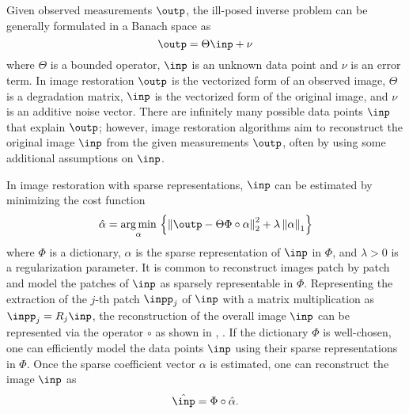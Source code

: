 \documentclass[journal]{IEEEtran}
\begin{document}
Given observed measurements $\outp$, the ill-posed inverse problem can be generally formulated in a Banach space as
\begin{equation}
	\label{eqn:inverse}
	\outp = \Theta \inp+\nu
\end{equation}
where $\Theta$ is a bounded operator, $\inp$ is an unknown data point and $\nu$ is an error term.  In image restoration $\outp$ is the vectorized form of an observed image, $\Theta$ is a degradation matrix, $\inp$ is the vectorized form of the original image, and $\nu$ is an additive noise vector. There are infinitely many possible data points $\inp$ that explain $\outp$; however, image restoration algorithms aim to reconstruct the original image $\inp$ from the given measurements $\outp$, often by using some additional assumptions on $\inp$. 

In image restoration with sparse representations, $\inp$ can be estimated by minimizing the cost function 
\begin{equation}
	\label{eqn:problem}
	\hat \alpha=\underset{\alpha}{\operatorname{arg\,min}} \, \left\{ \left\| \outp -\Theta\Phi\circ\alpha\right\|_{2}^{2} + \lambda \left\| \alpha \right\|_1\right\}
\end{equation}
where $\Phi$ is a  dictionary, $\alpha$ is the sparse representation of $\inp$ in $\Phi$, and $\lambda>0$ is a regularization parameter. It is common to reconstruct images patch by patch and model the patches of $\inp$ as sparsely representable in $\Phi$. Representing the extraction of the $j$-th patch $\inpp_j$ of $\inp$ with a matrix multiplication as $\inpp_j = R_j \inp$, the reconstruction of the overall image $\inp$ can be represented via the operator $\circ$ as shown in \cite{Dong13nonlocally}, \cite{Dong11image}.  If the dictionary $\Phi$ is well-chosen, one can efficiently model the data points $\inp$ using their sparse representations in $\Phi$. Once the sparse coefficient vector $\alpha$ is estimated, one can reconstruct the image $\inp$ as 
\begin{equation}
	\label{eqn:reconstruct}
	\hat{\inp} = \Phi\circ \hat\alpha . %
\end{equation}
\end{document}
